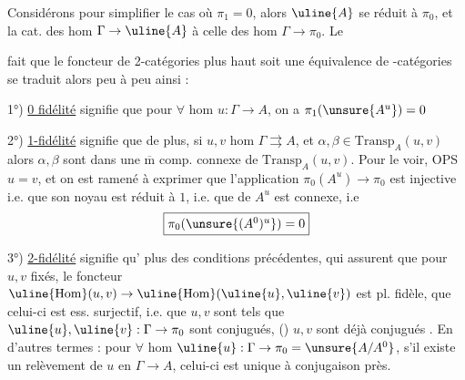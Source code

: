 Considérons pour simplifier le cas où \(\pi_1=0\), alors \(\uline{A}\) se réduit à \(\pi_0\), et la cat. des hom \(\Gamma\to\uline{A}\) à celle des hom \(\Gamma\to\pi_0\). Le



fait que le foncteur de 2-catégories plus haut  soit une équivalence de -catégories se traduit alors peu à peu ainsi :

1°) \uline{0 fidélité} signifie que pour \(\forall\) hom \(u:\Gamma\to A\), on a \(\pi_1(\unsure{A^u})=0\)


2°) \uline{1-fidélité} signifie que de plus, si \(u,v\)  hom \(\Gamma\rightrightarrows A\), et  \(\alpha,\beta\in\mathrm{Transp}_A(u,v)\)     alors \(\alpha,\beta\) sont dans une \(\overline{\mathrm m}\)  comp. connexe de \(\mathrm{Transp}_A(u,v)\).    Pour le voir, OPS \(u=v\), et on est ramené à exprimer que l'application \(\pi_0(A^u)\to\pi_0\) est injective i.e. que  son noyau est réduit à \(1\), i.e. que  de \(A^u\) est connexe, i.e
\[
\fbox{\(\pi_0(\unsure{(A^0)^u})=0\)}
\]



3°) \uline{2-fidélité} signifie qu' plus des conditions précédentes, qui assurent que pour \(u,v\) fixés, le foncteur \(\uline{\mathrm{Hom}}(u,v)\to\uline{\mathrm{Hom}}(\uline{u},\uline{v})\) est pl. fidèle, que celui-ci est ess. surjectif, i.e. que  \(u,v\) sont tels que \(\uline{u},\uline{v}:\Gamma\to\pi_0\) sont conjugués,  () \(u,v\) sont déjà conjugués . En d'autres termes : pour \(\forall\) hom \(\uline{u}:\Gamma\to\pi_0=\unsure{A/A^0}\), s'il existe un relèvement de \(u\) en \(\Gamma\to A\), celui-ci est unique à conjugaison près.

